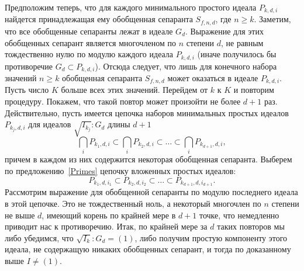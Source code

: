 \documentclass[a4paper,12pt,russian]{amsart}
\renewcommand{\ge}{\geqslant}
\theoremstyle{definition}
\begin{document}
Предположим теперь, что для каждого минимального простого идеала $P_{k,d,i}$
найдется принадлежащая ему обобщенная сепаранта $S_{f,n,d}$, где $n \ge k$.
Заметим, что все обобщенные сепаранты лежат в идеале $G_d$.
Выражение для этих обобщенных сепарант является многочленом по $n$ степени $d$,
не равным тождественно нулю по модулю каждого идеала $P_{k,d,i}$ (иначе получилось бы противоречие $G_d \subset P_{k,d,i}$).
Отсюда следует, что лишь для конечного набора значений $n \ge k$ обобщенная сепаранта $S_{f,n,d}$ может оказаться в идеале $P_{k,d,i}$.
Пусть число $K$ больше всех этих значений. Перейдем от $k$ к $K$ и повторим процедуру. Покажем, что такой повтор может произойти не более $d+1$ раз. Действительно, пусть имеется цепочка наборов минимальных простых идеалов $P_{k_j, d, i}$ для идеалов $\sqrt{I_{k_j}}:G_d$ длины $d+1$
$$
 \bigcap_i P_{k_1, d, i} \subset \bigcap_i P_{k_2, d, i} \subset \ldots \subset \bigcap_i P_{k_{d+1}, d, i},
$$
причем в каждом из них содержится некоторая обобщенная сепаранта.
Выберем по предложению~\ref{Primes} цепочку вложенных простых идеалов:
$$
 P_{k_1, d, i_1} \subset P_{k_2, d, i_2} \subset \ldots \subset P_{k_{d+1}, d, i_{d+1}}.
$$
Рассмотрим выражение для обобщенной сепаранты по модулю последнего идеала в этой цепочке. Это не тождественный ноль,
а некоторый многочлен по $n$ степени не выше $d$, имеющий корень по крайней мере в $d+1$ точке, что немедленно приводит нас к противоречию.
Итак, по крайней мере за $d$ таких повторов мы либо убедимся, что $\sqrt{I_k}:G_d = (1)$, либо получим простую компоненту этого идеала, не содержащую никаких обобщенных сепарант, и тогда по доказанному выше $I \ne (1)$.
\end{document}
